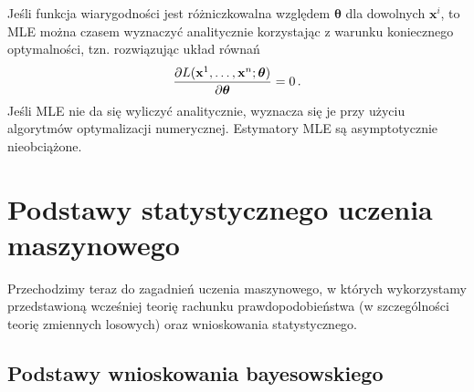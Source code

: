 \documentclass{myclass}
\numberwithin{equation}{section}
\begin{document}
Jeśli funkcja wiarygodności jest różniczkowalna względem \(\boldsymbol{\theta}\) dla dowolnych
\(\mathbf{x}^i\), to MLE można czasem wyznaczyć analitycznie korzystając z warunku koniecznego
optymalności, tzn. rozwiązując układ równań
\begin{equation}
    \pdv{L(\mathbf{x}^1,\ldots,\mathbf{x}^n; \boldsymbol{\theta})}{\boldsymbol{\theta}} = 0\,.
\end{equation}
Jeśli MLE nie da się wyliczyć analitycznie, wyznacza się je przy użyciu algorytmów optymalizacji
numerycznej. Estymatory MLE są asymptotycznie nieobciążone.


\section{Podstawy statystycznego uczenia maszynowego}

Przechodzimy teraz do zagadnień uczenia maszynowego, w których wykorzystamy przedstawioną wcześniej
teorię rachunku prawdopodobieństwa (w szczególności teorię zmiennych losowych) oraz wnioskowania
statystycznego.


\subsection{Podstawy wnioskowania bayesowskiego}
\end{document}

